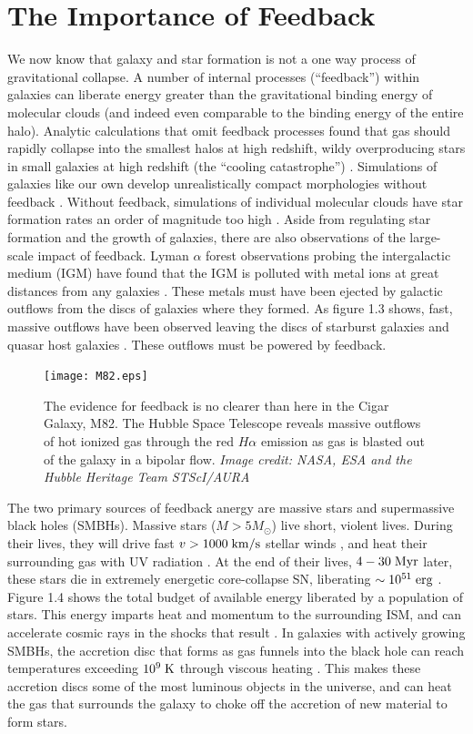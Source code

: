 \section{The Importance of Feedback}
We now know that galaxy and star formation is not a one way process of
gravitational collapse.  A number of internal processes (``feedback'') within
galaxies can liberate energy greater than the gravitational binding energy of
molecular clouds (and indeed even comparable to the binding energy of the entire
halo).  Analytic calculations that omit feedback processes found that gas should
rapidly collapse into the smallest halos at high redshift, wildy overproducing
stars in small galaxies at high redshift (the ``cooling catastrophe'')
\citep{Cole2001,Benson2003}.  Simulations of galaxies like our own develop unrealistically
compact morphologies without feedback \citep{Stinson2006}.  Without feedback, simulations of
individual molecular clouds have star formation rates an order of magnitude
too high \citep{Agertz2013}.  Aside from regulating star formation and the
growth of galaxies, there are also observations of the large-scale impact of
feedback. Lyman $\alpha$ forest observations probing the intergalactic medium
(IGM) have found that the IGM is polluted with metal ions at great distances
from any galaxies \citep{Sargent1988,Songaila1996,Dave1998}.  These metals must have
been ejected by galactic outflows from the discs of galaxies where they formed.
As figure 1.3 shows, fast, massive outflows have been observed leaving the discs of
starburst galaxies and quasar host galaxies \citep{Veilleux2005,Werk2014}.
These outflows must be powered by feedback.

\begin{figure}
    \texttt{[image: M82.eps]}
	\caption[Massive outflows in M82]{The evidence for feedback is no clearer
	than here in the Cigar Galaxy, M82.  The Hubble Space Telescope reveals massive
	outflows of hot ionized gas through the red $H\alpha$ emission as gas is
	blasted out of the galaxy in a bipolar flow. \textit{Image credit: NASA, ESA
	and the Hubble Heritage Team STScI/AURA}}
\end{figure}

The two primary sources of feedback anergy are massive stars and supermassive
black holes (SMBHs).  Massive stars ($M>5M_\odot$) live short, violent lives.
During their lives, they will drive fast $v>1000\;\rm{km/s}$ stellar winds
\citep{Weaver1977}, and heat their surrounding gas with UV radiation
\citep{Krumholz2009}.  At the end of their lives, $4-30\;\rm{Myr}$ later, these
stars die in extremely energetic core-collapse SN, liberating
$\sim10^{51}\;\rm{erg}$ \citep{Leitherer1999}.  Figure 1.4 shows the total
budget of available energy liberated by a population of stars.  This energy
imparts heat and momentum to the surrounding ISM, and can accelerate cosmic rays
in the shocks that result \citep{Bell1978}.  In galaxies with actively growing
SMBHs, the accretion disc that forms as gas funnels into the black hole can
reach temperatures exceeding $10^9\;\rm{K}$ through viscous heating
\citep{Antonucci1993}.  This makes
these accretion discs some of the most luminous objects in the universe, and can
heat the gas that surrounds the galaxy to choke off the accretion of new
material to form stars.

